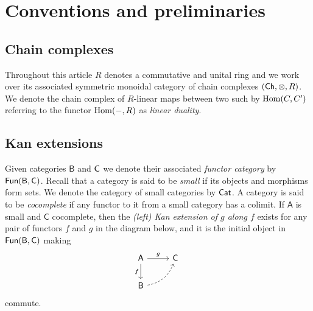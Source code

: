 
\section{Conventions and preliminaries} \label{s:preliminaries}

\subsection{Chain complexes}

Throughout this article $R$ denotes a commutative and unital ring and we work over its associated symmetric monoidal category of chain complexes $(\mathsf{Ch}, \otimes, R)$.
We denote the chain complex of $R$-linear maps between two such by $\mathrm{Hom}(C, C^\prime)$ referring to the functor $\mathrm{Hom}(-, R)$ as \textit{linear duality}.

\subsection{Kan extensions}

Given categories $\mathsf{B}$ and $\mathsf{C}$ we denote their associated \textit{functor category} by $\mathsf{Fun}(\mathsf{B}, \mathsf{C})$.
Recall that a category is said to be \textit{small} if its objects and morphisms form sets.
We denote the category of small categories by $\mathsf{Cat}$.
A category is said to be \textit{cocomplete} if any functor to it from a small category has a colimit.
If $\mathsf{A}$ is small and $\mathsf{C}$ cocomplete, then the \textit{(left) Kan extension of $g$ along $f$} exists for any pair of functors $f$ and $g$ in the diagram below, and it is the initial object in $\mathsf{Fun}(\mathsf{B}, \mathsf{C})$ making
\begin{equation*}
\begin{tikzcd}[column sep=normal, row sep=normal]
\mathsf{A} \arrow[d, "f"'] \arrow[r, "g"] & \mathsf{C} \\ 
\mathsf{B} \arrow[dashed, ur, bend right] & \quad 
\end{tikzcd}
\end{equation*}
commute.
